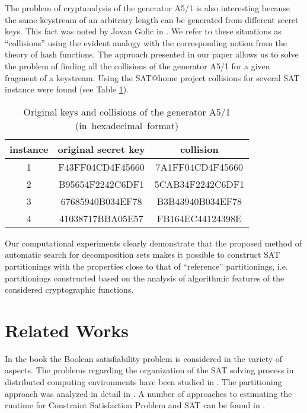 \documentclass[runningheads,a4paper]{llncs}
\begin{document}
The problem of cryptanalysis of the generator A5/1 is also interesting because the same keystream of an arbitrary length can be generated from different secret keys. This fact was noted by Jovan Golic in \cite{Golic:1997:CAA:1754542.1754566}. We refer to these situations as ``collisions'' using the evident analogy with the corresponding notion from the theory of hash functions. The approach presented in our paper allows us to solve the problem of finding all the collisions of the generator A5/1 for a given fragment of a keystream. Using the SAT@home project collisions for several SAT instance were found (see Table \ref{Collisions}).

\begin{table}
\renewcommand{\arraystretch}{1.3}
\caption{Original keys and collisions of the generator A5/1 \mbox{(in hexadecimal format)} }
\label{Collisions}
\centering
\begin{tabular}{c|c|c}
\textbf{instance} & \textbf{original secret key} & \textbf{collision} \\ 
\hline
1 & F43FF04CD4F45660 & 7A1FF04CD4F45660 \\
\hline 
2 & B95654F2242C6DF1 & 5CAB34F2242C6DF1 \\
\hline 
3 & 67685940B034EF78 & B3B43940B034EF78 \\
\hline 
4 & 41038717BBA05E57 & FB164EC44124398E \\
\end{tabular}
\end{table}

Our computational experiments clearly demonstrate that the proposed method of automatic search for decomposition sets makes it possible to
construct SAT partitionings with the properties close to that of ``reference'' partitionings, i.e. partitionings constructed based on the analysis of algorithmic features of the considered cryptographic functions.

\section{Related Works}
In the book \cite{DBLP:series/faia/2009-185} the Boolean satisfiability problem is considered in the variety of aspects. The problems regarding the organization of the SAT solving process in distributed computing environments have been studied in \cite{DBLP:journals/jsc/ZhangBH96,DBLP:journals/pc/BlochingerSK03,DBLP:conf/sat/HyvarinenJN06,DBLP:journals/pc/ChrabakhW06,DBLP:conf/hvc/HeuleKWB11,Hyvarinen11}. The partitioning approach was analyzed in detail in \cite{DBLP:conf/sat/HyvarinenJN06,DBLP:conf/lpar/HyvarinenJN10,Hyvarinen11}. A number of approaches to estimating the runtime for Constraint Satisfaction Problem and SAT can be found in \cite{DBLP:journals/tcad/AloulSS03,DBLP:conf/aaai/KilbySTW06,DBLP:conf/sat/HaimW08,DBLP:journals/jair/XuHHL08}.
\end{document}
